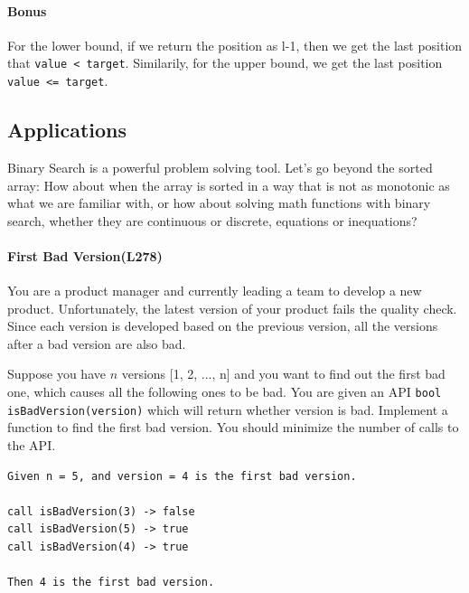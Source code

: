 \documentclass[main.tex]{subfiles}
\begin{document}
\paragraph{Bonus} For the lower bound, if we return the position as l-1, then we get the last position that \texttt{value < target}. Similarily, for the upper bound, we get  the last position \texttt{value <= target}.

\subsection{Applications}
\label{concept_binary_search_in_array}
Binary Search is a powerful problem solving tool. Let's go beyond the sorted array: How about when the array is sorted in a way that  is not as monotonic as what we are familiar with, or how about solving math functions with binary search, whether they are continuous or discrete, equations or inequations?
\paragraph{First Bad Version(L278)} You are a product manager and currently leading a team to develop a new product. Unfortunately, the latest version of your product fails the quality check. Since each version is developed based on the previous version, all the versions after a bad version are also bad.

Suppose you have $n$ versions [1, 2, ..., n] and you want to find out the first bad one, which causes all the following ones to be bad. You are given an API \texttt{bool isBadVersion(version)} which will return whether version is bad. Implement a function to find the first bad version. You should minimize the number of calls to the API.
\begin{lstlisting}[numbers=none]
Given n = 5, and version = 4 is the first bad version.

call isBadVersion(3) -> false
call isBadVersion(5) -> true
call isBadVersion(4) -> true

Then 4 is the first bad version.
\end{lstlisting}
\end{document}
